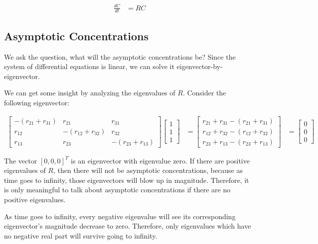 \documentclass{article}
\begin{document}
\begin{align}
\frac{dC}{dt} & = R C \label{eq:dCdt}
\end{align}

\subsection{Asymptotic Concentrations}

We ask the question, what will the asymptotic concentrations be?
Since the system of differential equations is linear, we can solve it
	eigenvector-by-eigenvector.

We can get some insight by analyzing the eigenvalues of $R$.
Consider the following eigenvector:

\begin{align*}
\left[ \begin{matrix}
	- \left( r_{21} + r_{31} \right) & r_{21} & r_{31} \\
	r_{12} & - \left( r_{12} + r_{32} \right) & r_{32} \\
	r_{13} & r_{23} & - \left( r_{23} + r_{13} \right) 
\end{matrix} \right]
\left[ \begin{matrix} 1 \\ 1 \\ 1 \end{matrix} \right]
& = \left[ \begin{matrix} 
	r_{21} + r_{31} - \left( r_{21} + r_{31} \right) \\
	r_{12} + r_{32} - \left( r_{12} + r_{32} \right) \\
	r_{23} + r_{13} - \left( r_{23} + r_{13} \right) 
\end{matrix} \right]
& = \left[ \begin{matrix} 0 \\ 0 \\ 0 \end{matrix} \right]
\end{align*}

The vector $\left[ 0, 0, 0 \right]^T$ is an eigenvector with 
	eigenvalue zero.
If there are positive eigenvalues of $R$, then there will not
	be asymptotic concentrations, because as time goes to infinity,
	those eigenvectors will blow up in magnitude.
Therefore, it is only meaningful to talk about asymptotic concentrations
	if there are no positive eigenvalues.

As time goes to infinity, every negative eigenvalue will
	see its corresponding eigenvector's magnitude decrease to zero.
Therefore, only eigenvalues which have no negative real part will
	survive going to infinity.
\end{document}
